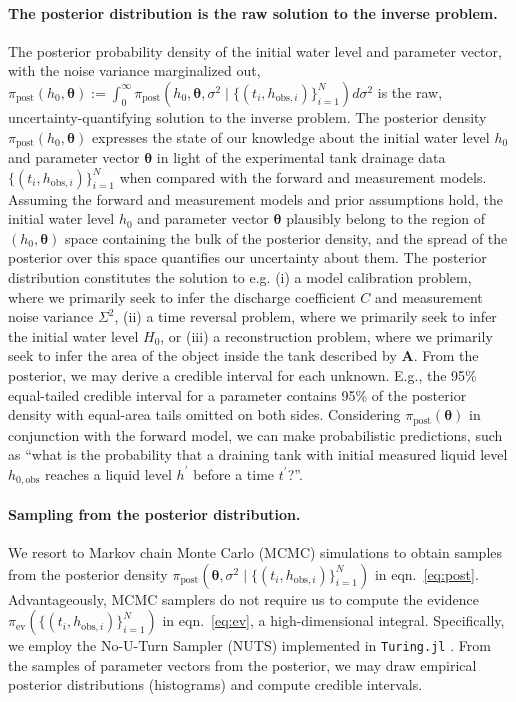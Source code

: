 \documentclass[openacc]{rsproca_new}%
\newcommand\thedata {$\{(t_i,h_{\text{obs}, i})\}_{i=1}^{N}$\xspace}
\newcommand\thedatanomath {\{(t_i,h_{\text{obs}, i})\}_{i=1}^{N}}
\begin{document}
\paragraph{The posterior distribution is the raw solution to the inverse problem.}
The posterior probability density of the initial water level and parameter vector, with the noise variance marginalized out, $\pi_{\text{post}}(h_0, \boldsymbol\theta) := \int_0^\infty \pi_{\text{post}}(h_0, \boldsymbol \theta, \sigma^2 \mid \thedatanomath) d\sigma^2$ is the raw, uncertainty-quantifying solution to the inverse problem.
The posterior density $\pi_{\text{post}}(h_0, \boldsymbol\theta)$ expresses the state of our knowledge about the initial water level $h_0$ and parameter vector $\boldsymbol \theta$ in light of the experimental tank drainage data \thedata when compared with the forward and measurement models. Assuming the forward and measurement models and prior assumptions hold, the initial water level $h_0$ and parameter vector $\boldsymbol \theta$ plausibly belong to the region of $(h_0, \boldsymbol \theta)$ space containing the bulk of the posterior density, and the spread of the posterior over this space quantifies our uncertainty about them.
The posterior distribution constitutes the solution to e.g. (i) a model calibration problem, where we primarily seek to infer the discharge coefficient $C$ and measurement noise variance $\Sigma^2$, (ii) a time reversal problem, where we primarily seek to infer the initial water level $H_0$, or (iii) a reconstruction problem, where we primarily seek to infer the area of the object inside the tank described by $\mathbf{A}$. 
From the posterior, we may derive a credible interval for each unknown. E.g., the 95\% equal-tailed credible interval for a parameter contains 95\% of the posterior density with equal-area tails omitted on both sides. 
Considering $\pi_{\text{post}}(\boldsymbol\theta)$ in conjunction with the forward model, we can make probabilistic predictions, such as ``what is the probability that a draining tank with initial measured liquid level $h_{0, \text{obs}}$ reaches a liquid level $h^\prime$ before a time $t^\prime$?''.

\paragraph{Sampling from the posterior distribution.} We resort to Markov chain Monte Carlo (MCMC) simulations to obtain samples from the posterior density $\pi_{\text{post}}(\boldsymbol \theta, \sigma^2 \mid \thedatanomath)$ in eqn.~\ref{eq:post}. Advantageously, MCMC samplers do not require us to compute the evidence $\pi_{\text{ev}}(\thedatanomath)$ in eqn.~\ref{eq:ev}, a high-dimensional integral. Specifically, we employ the No-U-Turn Sampler (NUTS) \cite{hoffman2014no} implemented in \texttt{Turing.jl} \cite{ge2018turing}. From the samples of parameter vectors from the posterior, we may draw empirical posterior distributions (histograms) and compute credible intervals.
\end{document}
